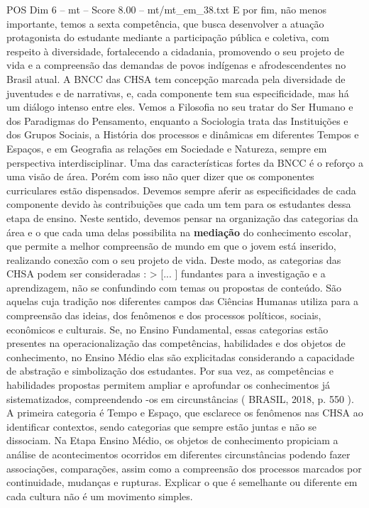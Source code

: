 \begin{textsample}{POS Dim 6 – mt – Score 8.00 – mt/mt\_em\_38.txt}
E por fim, não menos importante, temos a sexta competência, que busca desenvolver a atuação protagonista do estudante mediante a participação pública e coletiva, com respeito à diversidade, fortalecendo a cidadania, promovendo o seu projeto de vida e a compreensão das demandas de povos indígenas e afrodescendentes no Brasil atual.
A BNCC das CHSA tem concepção marcada pela diversidade de juventudes e de narrativas, e, cada componente tem sua especificidade, mas há um diálogo intenso entre eles.
Vemos a Filosofia no seu tratar do Ser Humano e dos Paradigmas do Pensamento, enquanto a Sociologia trata das Instituições e dos Grupos Sociais, a História dos processos e dinâmicas em diferentes Tempos e Espaços, e em Geografia as relações em Sociedade e Natureza, sempre em perspectiva interdisciplinar.
Uma das características fortes da BNCC é o reforço a uma visão de área.
Porém com isso não quer dizer que os componentes curriculares estão dispensados.
Devemos sempre aferir as especificidades de cada componente devido às contribuições que cada um tem para os estudantes dessa etapa de ensino.
Neste sentido, devemos pensar na organização das categorias da área e o que cada uma delas possibilita na \textbf{mediação} do conhecimento escolar, que permite a melhor compreensão de mundo em que o jovem está inserido, realizando conexão com o seu projeto de vida.
Deste modo, as categorias das CHSA podem ser consideradas : > [... ] fundantes para a investigação e a aprendizagem, não se confundindo com temas ou propostas de conteúdo.
São aquelas cuja tradição nos diferentes campos das Ciências Humanas utiliza para a compreensão das ideias, dos fenômenos e dos processos políticos, sociais, econômicos e culturais.
Se, no Ensino Fundamental, essas categorias estão presentes na operacionalização das competências, habilidades e dos objetos de conhecimento, no Ensino Médio elas são explicitadas considerando a capacidade de abstração e simbolização dos estudantes.
Por sua vez, as competências e habilidades propostas permitem ampliar e aprofundar os conhecimentos já sistematizados, compreendendo -os em circunstâncias ( BRASIL, 2018, p. 550 ).
A primeira categoria é Tempo e Espaço, que esclarece os fenômenos nas CHSA ao identificar contextos, sendo categorias que sempre estão juntas e não se dissociam.
Na Etapa Ensino Médio, os objetos de conhecimento propiciam a análise de acontecimentos ocorridos em diferentes circunstâncias podendo fazer associações, comparações, assim como a compreensão dos processos marcados por continuidade, mudanças e rupturas.
Explicar o que é semelhante ou diferente em cada cultura não é um movimento simples.

\end{textsample}
